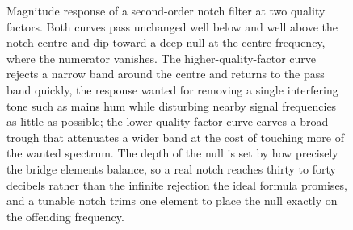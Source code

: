 \begin{figure}[htbp]
\centering
{}
\caption[Notch (band-reject) filter magnitude at two quality factors]{Magnitude
response of a second-order notch filter at two quality factors. Both curves pass
unchanged well below and well above the notch centre and dip toward a deep null
at the centre frequency, where the numerator vanishes. The higher-quality-factor
curve rejects a narrow band around the centre and returns to the pass band
quickly, the response wanted for removing a single interfering tone such as
mains hum while disturbing nearby signal frequencies as little as possible; the
lower-quality-factor curve carves a broad trough that attenuates a wider band at
the cost of touching more of the wanted spectrum. The depth of the null is set
by how precisely the bridge elements balance, so a real notch reaches thirty to
forty decibels rather than the infinite rejection the ideal formula promises,
and a tunable notch trims one element to place the null exactly on the offending
frequency.}
\label{fig:vol04ch09:notch-response}
\end{figure}
